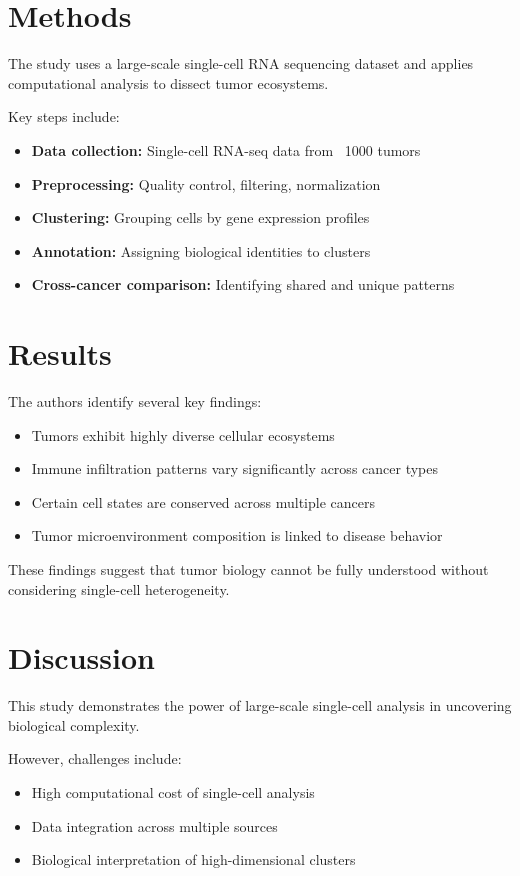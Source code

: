 \documentclass[12pt]{article}
\begin{document}
\section{Methods}

The study uses a large-scale single-cell RNA sequencing dataset and applies computational analysis to dissect tumor ecosystems.

Key steps include:
\begin{itemize}
    \item \textbf{Data collection:} Single-cell RNA-seq data from ~1000 tumors
    \item \textbf{Preprocessing:} Quality control, filtering, normalization
    \item \textbf{Clustering:} Grouping cells by gene expression profiles
    \item \textbf{Annotation:} Assigning biological identities to clusters
    \item \textbf{Cross-cancer comparison:} Identifying shared and unique patterns
\end{itemize}

\section{Results}

The authors identify several key findings:
\begin{itemize}
    \item Tumors exhibit highly diverse cellular ecosystems
    \item Immune infiltration patterns vary significantly across cancer types
    \item Certain cell states are conserved across multiple cancers
    \item Tumor microenvironment composition is linked to disease behavior
\end{itemize}

These findings suggest that tumor biology cannot be fully understood without considering single-cell heterogeneity.

\section{Discussion}

This study demonstrates the power of large-scale single-cell analysis in uncovering biological complexity.

However, challenges include:
\begin{itemize}
    \item High computational cost of single-cell analysis
    \item Data integration across multiple sources
    \item Biological interpretation of high-dimensional clusters
\end{itemize}
\end{document}
